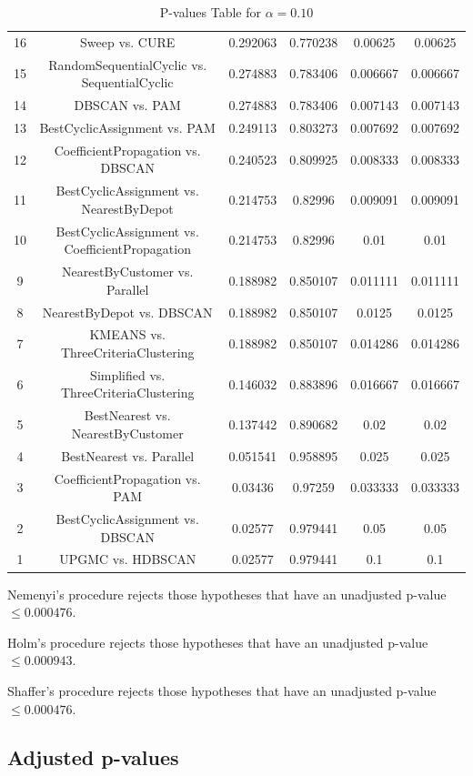 \documentclass[a4paper,10pt]{article}
\begin{document}
\begin{landscape}
\begin{table}[!htp]
\begin{tabular}{cccccc}
16&Sweep vs. CURE&0.292063&0.770238&0.00625&0.00625\\
15&RandomSequentialCyclic vs. SequentialCyclic&0.274883&0.783406&0.006667&0.006667\\
14&DBSCAN vs. PAM&0.274883&0.783406&0.007143&0.007143\\
13&BestCyclicAssignment vs. PAM&0.249113&0.803273&0.007692&0.007692\\
12&CoefficientPropagation vs. DBSCAN&0.240523&0.809925&0.008333&0.008333\\
11&BestCyclicAssignment vs. NearestByDepot&0.214753&0.82996&0.009091&0.009091\\
10&BestCyclicAssignment vs. CoefficientPropagation&0.214753&0.82996&0.01&0.01\\
9&NearestByCustomer vs. Parallel&0.188982&0.850107&0.011111&0.011111\\
8&NearestByDepot vs. DBSCAN&0.188982&0.850107&0.0125&0.0125\\
7&KMEANS vs. ThreeCriteriaClustering&0.188982&0.850107&0.014286&0.014286\\
6&Simplified vs. ThreeCriteriaClustering&0.146032&0.883896&0.016667&0.016667\\
5&BestNearest vs. NearestByCustomer&0.137442&0.890682&0.02&0.02\\
4&BestNearest vs. Parallel&0.051541&0.958895&0.025&0.025\\
3&CoefficientPropagation vs. PAM&0.03436&0.97259&0.033333&0.033333\\
2&BestCyclicAssignment vs. DBSCAN&0.02577&0.979441&0.05&0.05\\
1&UPGMC vs. HDBSCAN&0.02577&0.979441&0.1&0.1\\
\hline
\end{tabular}
\caption{P-values Table for $\alpha=0.10$}
\end{table}Nemenyi's procedure rejects those hypotheses that have an unadjusted p-value $\le0.000476$.

Holm's procedure rejects those hypotheses that have an unadjusted p-value $\le0.000943$.

Shaffer's procedure rejects those hypotheses that have an unadjusted p-value $\le0.000476$.

\pagebreak

\subsection{Adjusted p-values}


\end{landscape}
\end{document}
